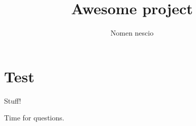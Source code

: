 \documentclass[ignorenonframetext, ngerman]{beamer}
\title{Awesome project}
\author{Nomen nescio}
\begin{document}
    \frame{\titlepage}
    \frame{\tableofcontents[pausesections]}
    \section{Test}

    \begin{frame}
        Stuff!
    \end{frame}

    \appendix
    \begin{frame}
        \Huge
        Time for questions.
    \end{frame}
\end{document}
